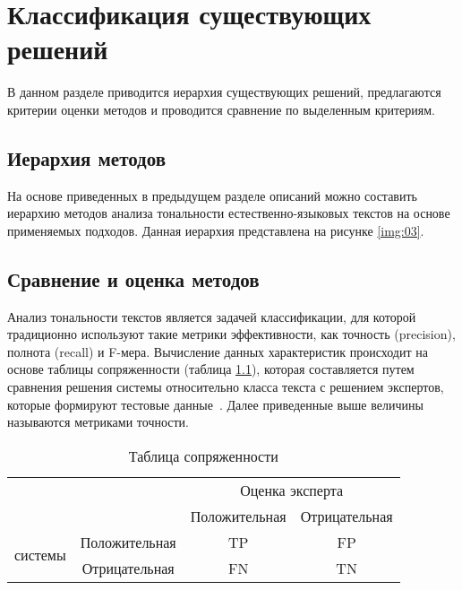 \chapter{Классификация существующих решений}

В данном разделе приводится иерархия существующих решений, предлагаются
критерии оценки методов и проводится сравнение по выделенным критериям.

\section{Иерархия методов}

На основе приведенных в предыдущем разделе описаний можно составить иерархию
методов анализа тональности естественно-языковых текстов на основе применяемых
подходов. Данная иерархия представлена на рисунке \ref{img:03}.


\section{Сравнение и оценка методов}

Анализ тональности текстов является задачей классификации, для которой
традиционно используют такие метрики эффективности, как точность
(precision), полнота (recall) и F-мера. Вычисление данных
характеристик происходит на основе таблицы сопряженности (таблица
\ref{tab:01}), которая составляется путем сравнения решения системы
относительно класса текста с решением экспертов, которые
формируют тестовые данные~\cite{article18}. Далее приведенные выше величины
называются метриками точности.

\noindent
\captionsetup{format=hang,justification=raggedright,
              singlelinecheck=off,width=13.7cm}
\begin{longtable}[c]{|c|c|c|c|}
\caption{Таблица сопряженности\label{tab:01}}\\
    \hline
    \multicolumn{2}{|c|}{\multirow{2}{*}{}} & \multicolumn{2}{c|}{Оценка
                                                                  эксперта} \\
    \cline{3-4}
    \multicolumn{2}{|c|}{} & Положительная & Отрицательная \\
    \hline
    \multirow{2}{*}{\parbox[c]{2cm}{ системы}} 
    & Положительная & TP & FP \\
    \cline{2-4}
    & Отрицательная & FN & TN \\
    \hline
\end{longtable}


